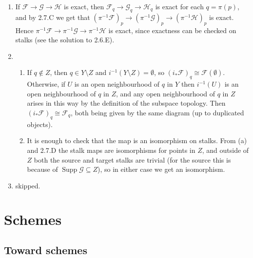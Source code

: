 \documentclass{report}
\newcommand{\scrF}{\mathscr{F}}
\newcommand{\scrG}{\mathscr{G}}
\newcommand{\scrH}{\mathscr{H}}
\DeclareMathOperator{\Supp}{Supp}
\begin{document}
\begin{enumerate}[label=\textbf{2.7.\Alph*.}]
	\item If $\scrF\to\scrG\to\scrH$ is exact, then $\scrF_q\to\scrG_q\to\scrH_q$ is exact for
	      each $q=\pi(p)$, and by 2.7.C we get that
	      $(\pi^{-1}\scrF)_p\to(\pi^{-1}\scrG)_p\to(\pi^{-1}\scrH)_p$ is exact. Hence
	      $\pi^{-1}\scrF\to\pi^{-1}\scrG\to\pi^{-1}\scrH$ is exact, since exactness can be
	      checked on stalks (see the solution to 2.6.E).

	\item
	      \begin{enumerate}[label=(\alph*)]
		      \item If $q\notin Z$, then $q\in Y\setminus Z$ and
		            $i^{-1}(Y\setminus Z)=\emptyset$, so
		            $(i_*\scrF)_q\cong\scrF(\emptyset)$. Otherwise, if $U$ is an open
		            neighbourhood of $q$ in $Y$ then $i^{-1}(U)$ is an open
		            neighbourhood of $q$ in $Z$, and any open neighbourhood of $q$
		            in $Z$ arises in this way by the definition of the subspace
		            topology. Then $(i_*\scrF)_q\cong\scrF_q$, both being given by the
		            same diagram (up to duplicated objects).

		      \item It is enough to check that the map is an isomorphism on
		            stalks. From (a) and 2.7.D the stalk maps are isomorphisms for
		            points in $Z$, and outside of $Z$ both the source and target
		            stalks are trivial (for the source this is because of
		            $\Supp\scrG\subseteq Z$), so in either case we get an
		            isomorphism.
	      \end{enumerate}

	\item skipped.
\end{enumerate}


\part{Schemes}

\chapter{Toward schemes}
\end{document}

